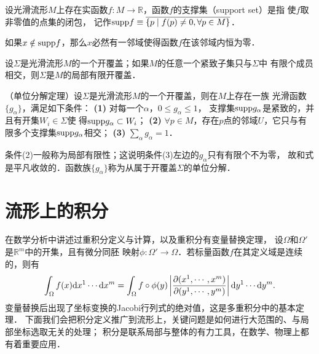 
\begin{definition}
    设光滑流形$M$上存在实函数$f:M\to \mathbb{R}$，函数$f$的{\heiti 支撑集}（support set）是指
    使$f$取非零值的点集的闭包，
    记作${\rm supp} f \equiv \overline{\{p\mid f(p)\neq 0, \forall p\in M \}}$．
\end{definition}
如果$x\notin {\rm supp} f$，那么$x$必然有一邻域使得函数$f$在该邻域内恒为零．

\begin{definition}
    设$\Sigma$是光滑流形$M$的一个开覆盖；如果$M$的任意一个紧致子集只与$\Sigma$中
    有限个成员相交，则$\Sigma$是$M$的{\heiti 局部有限开覆盖}．
\end{definition}


\begin{theorem}\label{chdf:thm_partition-unity}
    （单位分解定理）设$\Sigma$是光滑流形$M$的一个开覆盖，则在$M$上{\heiti 存在}一族
    光滑函数$\{g_\alpha\}$，满足如下条件：
    {\bfseries (1)} 对每一个$\alpha$，$0\leqslant g_\alpha \leqslant 1$，
    支撑集${\rm supp}g_\alpha$是紧致的，并且有开集$W_i \in \Sigma$使
    得${\rm supp}g_\alpha \subset W_i$；
    {\bfseries (2)} $\forall p\in M$，存在$p$点的邻域$U$，它只与有限多个支撑集${\rm supp}g_\alpha$相交；
    {\bfseries (3)} $\sum_{\alpha} g_\alpha =1$．
\end{theorem}
条件(2)一般称为{\kaishu 局部有限性}；这说明条件(3)左边的$g_\alpha$只有有限个不为零，
故和式是平凡收敛的．{\kaishu 函数族$\{g_\alpha\}$称为从属于开覆盖$\Sigma$的单位分解}．





\section{流形上的积分}\label{chdf:sec_integral-on-manifold}
在数学分析中讲述过重积分定义与计算，以及重积分有变量替换定理，
设$\Omega$和$\Omega'$是$\mathbb{R}^m$中的开集，且有微分同胚
映射$\phi:\Omega'\to \Omega$．若标量函数$f$在其定义域是连续的，则有
\begin{equation}\label{chdf:eqn_multiple-integral}
    \int_{\Omega} f(x) {\rm d}x^1 \cdots {\rm d}x^m = \int_{\Omega} f\circ\phi(y)
    \left|\frac{\partial (x^1, \cdots, x^m)}{\partial (y^1,\cdots, y^m)}
     \right|{\rm d}y^1 \cdots {\rm d}y^m .
\end{equation}
变量替换后出现了坐标变换的Jacobi行列式的绝对值，这是多重积分中的基本定理．
下面我们会把积分定义推广到流形上，关键问题是如何进行大范围的、与局部坐标选取无关的处理；
积分是联系局部与整体的有力工具，在数学、物理上都有着重要应用．

